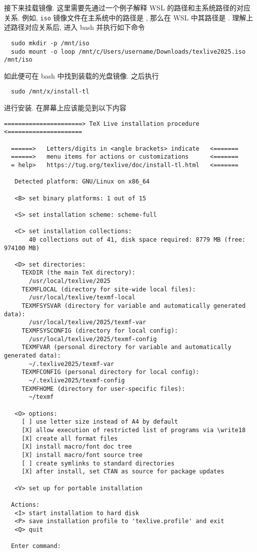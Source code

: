接下来挂载镜像.
这里需要先通过一个例子解释 WSL 的路径和主系统路径的对应关系.
例如, \texttt{iso} 镜像文件在主系统中的路径是 ,
那么在 WSL 中其路径是 .
理解上述路径对应关系后,
进入 \textsf{bash} 并执行如下命令
\begin{lstlisting}
  sudo mkdir -p /mnt/iso
  sudo mount -o loop /mnt/c/Users/username/Downloads/texlive2025.iso /mnt/iso
\end{lstlisting}
如此便可在 \textsf{bash} 中找到装载的光盘镜像.
之后执行
\begin{lstlisting}
  sudo /mnt/x/install-tl
\end{lstlisting}
进行安装.
在屏幕上应该能见到以下内容
\begin{lstlisting}[language = {}, deleteemph = set]
  ======================> TeX Live installation procedure <=====================

  ======>   Letters/digits in <angle brackets> indicate   <=======
  ======>   menu items for actions or customizations      <=======
  = help>   https://tug.org/texlive/doc/install-tl.html   <=======
  
   Detected platform: GNU/Linux on x86_64
  
   <B> set binary platforms: 1 out of 15
  
   <S> set installation scheme: scheme-full
  
   <C> set installation collections:
       40 collections out of 41, disk space required: 8779 MB (free: 974100 MB)
  
   <D> set directories:
     TEXDIR (the main TeX directory):
       /usr/local/texlive/2025
     TEXMFLOCAL (directory for site-wide local files):
       /usr/local/texlive/texmf-local
     TEXMFSYSVAR (directory for variable and automatically generated data):
       /usr/local/texlive/2025/texmf-var
     TEXMFSYSCONFIG (directory for local config):
       /usr/local/texlive/2025/texmf-config
     TEXMFVAR (personal directory for variable and automatically generated data):
       ~/.texlive2025/texmf-var
     TEXMFCONFIG (personal directory for local config):
       ~/.texlive2025/texmf-config
     TEXMFHOME (directory for user-specific files):
       ~/texmf
  
   <O> options:
     [ ] use letter size instead of A4 by default
     [X] allow execution of restricted list of programs via \write18
     [X] create all format files
     [X] install macro/font doc tree
     [X] install macro/font source tree
     [ ] create symlinks to standard directories
     [X] after install, set CTAN as source for package updates
  
   <V> set up for portable installation
  
  Actions:
   <I> start installation to hard disk
   <P> save installation profile to 'texlive.profile' and exit
   <Q> quit
  
  Enter command:
\end{lstlisting}
